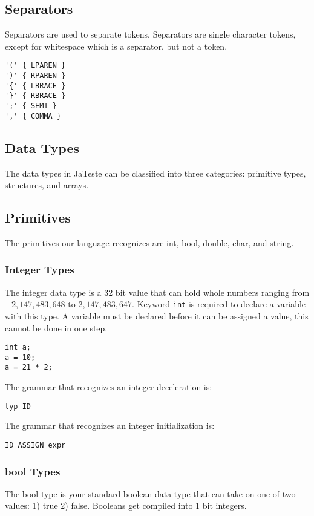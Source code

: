 \documentclass{article}
\begin{document}
\subsection{Separators}
Separators are used to separate tokens. Separators are single character tokens, except for whitespace which is a separator, but not a token. 
\begin{Verbatim}[frame=single]
'('	{ LPAREN }
')'	{ RPAREN }
'{'	{ LBRACE }
'}'	{ RBRACE }
';'	{ SEMI }
','	{ COMMA }
\end{Verbatim}

\subsection{Data Types}
The data types in JaTeste can be classified into three categories: primitive types, structures, and arrays. 

\subsection{Primitives}
The primitives our language recognizes are int, bool, double, char, and string. 

\subsubsection{Integer Types}
The integer data type is a 32 bit value that can hold whole numbers ranging from $-2,147,483,648 \text{ to } 2,147,483,647$. Keyword \texttt{int} is required to declare a variable with this type.  A variable must be declared before it can be assigned a value, this cannot be done in one step.

\begin{lstlisting}
int a;
a = 10;
a = 21 * 2;
\end{lstlisting}

The grammar that recognizes an integer deceleration is: 
\begin{Verbatim}[frame=single]
typ ID
\end{Verbatim}

The grammar that recognizes an integer initialization is: 
\begin{Verbatim}[frame=single]
ID ASSIGN expr
\end{Verbatim}

\subsubsection{bool Types}
The bool type is your standard boolean data type that can take on one of two values: 1) true 2) false. Booleans get compiled into 1 bit integers.
\end{document}

